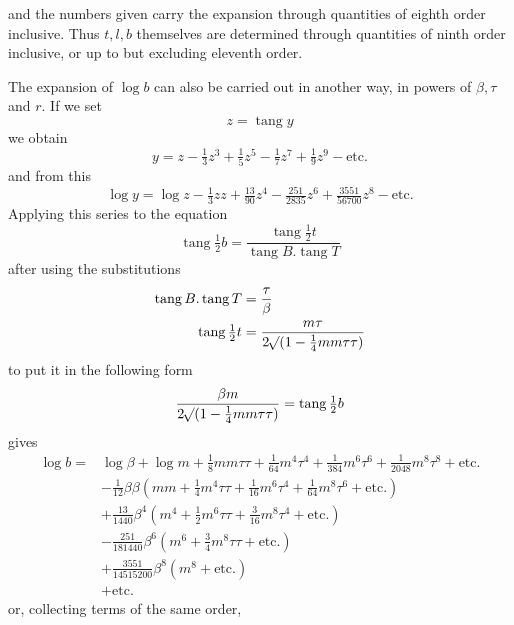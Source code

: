 %
and the numbers given carry the expansion through quantities of eighth order inclusive. Thus \(t,l,b\) themselves are determined through quantities of ninth order inclusive, or up to but excluding eleventh order.

The expansion of \(\log b\) can also be carried out in another way, in powers of \(\beta,\tau\) and \(r\). If we set
\[
z=\operatorname{tang}y
\]
we obtain
\[
y=z-\tfrac13z^3+\tfrac15z^5-\tfrac17z^7+\tfrac19z^9-\text{etc.}
\]
and from this
\[
\log y=\log z-\tfrac13zz+\tfrac{13}{90}z^4-\tfrac{251}{2835}z^6+\tfrac{3551}{56700}z^8-\text{etc.}
\]
Applying this series to the equation
\[
\operatorname{tang}\tfrac12b=\frac{\operatorname{tang}\frac12t}{\operatorname{tang}B\mathord{.}\operatorname{tang}T}
\]
after using the substitutions
\[
\begin{aligned}
\operatorname{tang}B\mathord{.}\operatorname{tang}T&=\frac\tau\beta\\
\operatorname{tang}\tfrac12t&=\frac{m\tau}{2\mathord{{}^{}\!\surd}(1-\frac14mm\tau\tau)}
\end{aligned}
\]
to put it in the following form
\[
\frac{\beta m}{2\mathord{{}^{}\!\surd}(1-\frac14mm\tau\tau)}=\operatorname{tang}\tfrac12b
\]
gives
\[
\begin{aligned}
\log b={}&\log\beta+\log m+\tfrac18mm\tau\tau+\tfrac1{64}m^4\tau^4+\tfrac1{384}m^6\tau^6+\tfrac1{2048}m^8\tau^8+\text{etc.}\\
&-\tfrac1{12}\beta\beta(mm+\tfrac14m^4\tau\tau+\tfrac1{16}m^6\tau^4+\tfrac1{64}m^8\tau^6+\text{etc.})\\
&+\tfrac{13}{1440}\beta^4(m^4+\tfrac12m^6\tau\tau+\tfrac3{16}m^8\tau^4+\text{etc.})\\
&-\tfrac{251}{181440}\beta^6(m^6+\tfrac34m^8\tau\tau+\text{etc.})\\
&+\tfrac{3551}{14515200}\beta^8(m^8+\text{etc.})\\
&+\text{etc.}
\end{aligned}
\]
or, collecting terms of the same order,
